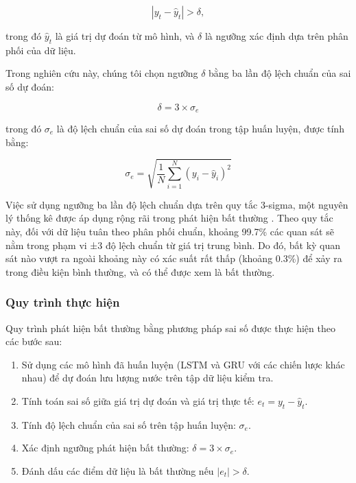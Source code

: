 \begin{equation}
    |y_t - \hat{y}_t| > \delta,
\end{equation}

trong đó \(\hat{y}_t\) là giá trị dự đoán từ mô hình, và \(\delta\) là ngưỡng xác định dựa trên phân phối của dữ liệu.

Trong nghiên cứu này, chúng tôi chọn ngưỡng \(\delta\) bằng ba lần độ lệch chuẩn của sai số dự đoán:

\begin{equation}
\delta = 3 \times \sigma_e
\end{equation}

trong đó \(\sigma_e\) là độ lệch chuẩn của sai số dự đoán trong tập huấn luyện, được tính bằng:

\begin{equation}
\sigma_e = \sqrt{\frac{1}{N} \sum_{i=1}^{N} (y_i - \hat{y}_i)^2}
\end{equation}

Việc sử dụng ngưỡng ba lần độ lệch chuẩn dựa trên quy tắc 3-sigma, một nguyên lý thống kê được áp dụng rộng rãi trong phát hiện bất thường \cite{malhotra2016lstm, hundman2018detecting}. Theo quy tắc này, đối với dữ liệu tuân theo phân phối chuẩn, khoảng 99.7\% các quan sát sẽ nằm trong phạm vi ±3 độ lệch chuẩn từ giá trị trung bình. Do đó, bất kỳ quan sát nào vượt ra ngoài khoảng này có xác suất rất thấp (khoảng 0.3\%) để xảy ra trong điều kiện bình thường, và có thể được xem là bất thường.

\subsubsection{Quy trình thực hiện}
Quy trình phát hiện bất thường bằng phương pháp sai số được thực hiện theo các bước sau:

\begin{enumerate}
    \item Sử dụng các mô hình đã huấn luyện (LSTM và GRU với các chiến lược khác nhau) để dự đoán lưu lượng nước trên tập dữ liệu kiểm tra.
    \item Tính toán sai số giữa giá trị dự đoán và giá trị thực tế: \(e_t = y_t - \hat{y}_t\).
    \item Tính độ lệch chuẩn của sai số trên tập huấn luyện: \(\sigma_e\).
    \item Xác định ngưỡng phát hiện bất thường: \(\delta = 3 \times \sigma_e\).
    \item Đánh dấu các điểm dữ liệu là bất thường nếu \(|e_t| > \delta\).
\end{enumerate}


